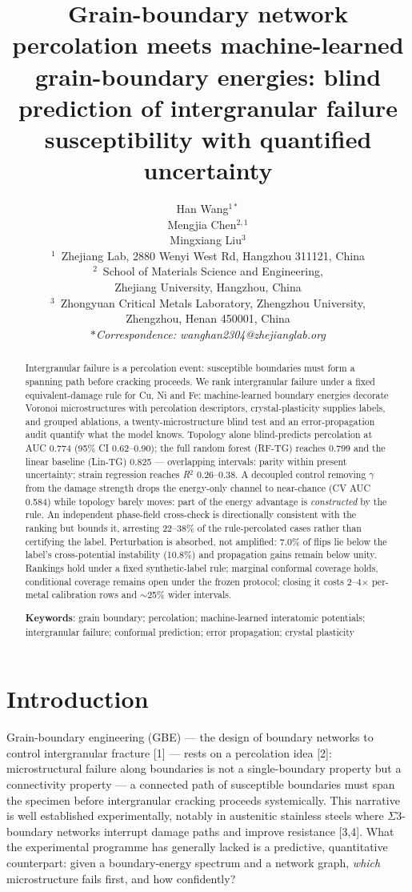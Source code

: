 \documentclass[11pt]{article}
\title{Grain-boundary network percolation meets machine-learned grain-boundary energies: blind prediction of intergranular failure susceptibility with quantified uncertainty}
\author{Han Wang$^{1*}$\\
Mengjia Chen$^{2,1}$\\
Mingxiang Liu$^{3}$\\
$^{1}$~Zhejiang Lab, 2880 Wenyi West Rd, Hangzhou 311121, China\\
$^{2}$~School of Materials Science and Engineering,\\ Zhejiang University, Hangzhou, China\\
$^{3}$~Zhongyuan Critical Metals Laboratory, Zhengzhou University,\\ Zhengzhou, Henan 450001, China\\
\textit{$*$Correspondence: wanghan2304@zhejianglab.org}}
\date{}
\begin{document}
\maketitle

\begin{abstract}
Intergranular failure is a percolation event: susceptible boundaries must form a spanning path before cracking proceeds. We rank intergranular failure under a fixed equivalent-damage rule for Cu, Ni and Fe: machine-learned boundary energies decorate Voronoi microstructures with percolation descriptors, crystal-plasticity supplies labels, and grouped ablations, a twenty-microstructure blind test and an error-propagation audit quantify what the model knows. Topology alone blind-predicts percolation at AUC 0.774 (95\% CI 0.62--0.90); the full random forest (RF-TG) reaches 0.799 and the linear baseline (Lin-TG) 0.825 --- overlapping intervals: parity within present uncertainty; strain regression reaches \textit{R}$^{2}$ 0.26--0.38. A decoupled control removing $\gamma$ from the damage strength drops the energy-only channel to near-chance (CV AUC 0.584) while topology barely moves: part of the energy advantage is \textit{constructed} by the rule. An independent phase-field cross-check is directionally consistent with the ranking but bounds it, arresting 22--38\% of the rule-percolated cases rather than certifying the label. Perturbation is absorbed, not amplified: 7.0\% of flips lie below the label's cross-potential instability (10.8\%) and propagation gains remain below unity. Rankings hold under a fixed synthetic-label rule; marginal conformal coverage holds, conditional coverage remains open under the frozen protocol; closing it costs 2--4$\times$ per-metal calibration rows and $\sim$25\% wider intervals.

\vspace{0.6em}
\noindent\textbf{Keywords}: grain boundary; percolation; machine-learned interatomic potentials; intergranular failure; conformal prediction; error propagation; crystal plasticity
\end{abstract}

\section{Introduction}

Grain-boundary engineering (GBE) --- the design of boundary networks to control intergranular fracture [1] --- rests on a percolation idea [2]: microstructural failure along boundaries is not a single-boundary property but a connectivity property --- a connected path of susceptible boundaries must span the specimen before intergranular cracking proceeds systemically. This narrative is well established experimentally, notably in austenitic stainless steels where $\Sigma$3-boundary networks interrupt damage paths and improve resistance [3,4]. What the experimental programme has generally lacked is a predictive, quantitative counterpart: given a boundary-energy spectrum and a network graph, \textit{which} microstructure fails first, and how confidently?
\end{document}
